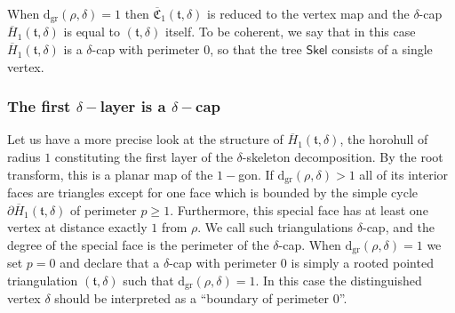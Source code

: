 \documentclass[10pt]{amsart}
\theoremstyle{definition}\newtheorem{defi}[theo]{Definition}\newtheorem{rema}[theo]{Remark}\newtheorem{exam}[theo]{Example}\newtheorem{exem}[theo]{Example}\newtheorem{nota}[theo]{Notation}
\begin{document}
\begin{center}
\end{center}

\begin{remark} When $ \mathrm{d_{gr}}(\rho,\delta)=1$ then $\overline{ \mathfrak{C}}_{1}( \mathfrak{t},\delta)$ is reduced to the vertex map and the $\delta$-cap $\overline{H}_{1}( \mathfrak{t}, \delta)$ is equal to $( \mathfrak{t},\delta)$ itself. To be coherent, we say that in this case $\overline{H}_{1}( \mathfrak{t}, \delta)$ is a $\delta$-cap with perimeter $0$, so that the tree $ \mathsf{Skel}$ consists of a single vertex.
\end{remark}

\subsubsection{The first \texorpdfstring{$\delta-$}{delta-}layer is a \texorpdfstring{$\delta-$}{delta-}cap}
\label{sec:caps}

Let us have a more precise look at the structure of $\overline{{H}}_1 ( \mathfrak{t}, \delta)$, the horohull of radius $1$ constituting the first layer of the $\delta$-skeleton decomposition. By the root transform, this is a planar map of the $1-$gon.  If $ \mathrm{d_{gr}}(\rho,\delta) > 1$ all of its interior faces are triangles except for one face which is bounded by the simple cycle $\partial \overline{H}_{1}( \mathfrak{t},\delta)$ of perimeter $p \geq 1$. Furthermore, this special face has at least one vertex at distance exactly $1$ from $\rho$. We call such triangulations $\delta$-cap, and the degree of the special face is the perimeter of the $\delta$-cap. When $\mathrm{d_{gr}}(\rho,\delta) = 1$ we set $p=0$ and declare that a $\delta$-cap with perimeter $0$ is simply a rooted pointed triangulation $( \mathfrak{t}, \delta)$ such that $ \mathrm{d_{gr}}(\rho,\delta)=1$. In this case the distinguished vertex $\delta$ should be interpreted as a ``boundary of perimeter $0$''. \medskip
\end{document}
